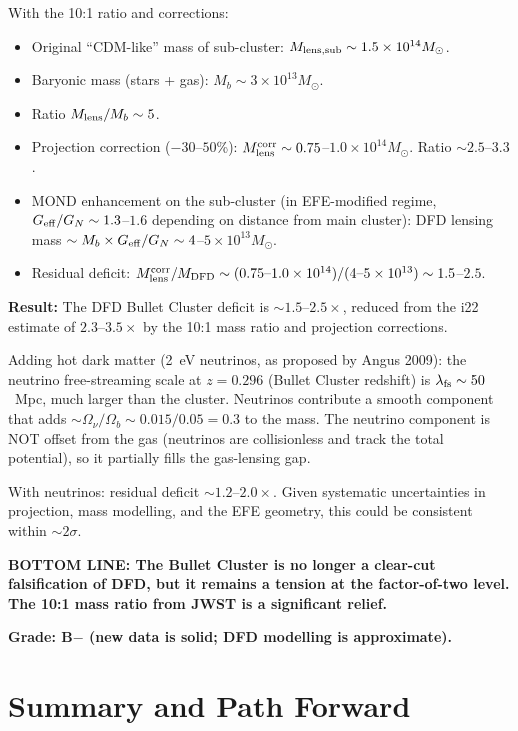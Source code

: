 \documentclass[11pt]{article}
\newcommand{\ee}[1]{\times 10^{#1}}
\newcommand{\Geff}{G_{\rm eff}}
\newcommand{\Ob}{\Omega_b}
\begin{document}
With the 10:1 ratio and corrections:
\begin{itemize}
\item Original ``CDM-like'' mass of sub-cluster: $M_{\rm lens,sub}
  \sim 1.5\ee{14} M_\odot$.
\item Baryonic mass (stars + gas): $M_b \sim 3\ee{13} M_\odot$.
\item Ratio $M_{\rm lens}/M_b \sim 5$.
\item Projection correction ($-30$--$50$\%): $M_{\rm lens}^{\rm corr}
  \sim 0.75$--$1.0\ee{14} M_\odot$.  Ratio $\sim 2.5$--$3.3$.
\item MOND enhancement on the sub-cluster (in EFE-modified regime,
  $\Geff/G_N \sim 1.3$--$1.6$ depending on distance from main cluster):
  DFD lensing mass $\sim M_b \times \Geff/G_N \sim 4$--$5\ee{13} M_\odot$.
\item Residual deficit: $M_{\rm lens}^{\rm corr}/M_{\rm DFD}
  \sim (0.75\text{--}1.0\ee{14})/(4\text{--}5\ee{13})
  \sim 1.5$--$2.5$.
\end{itemize}

\textbf{Result:}  The DFD Bullet Cluster deficit is $\sim 1.5$--$2.5
\times$, reduced from the i22 estimate of $2.3$--$3.5\times$ by the
10:1 mass ratio and projection corrections.

Adding hot dark matter (2~eV neutrinos, as proposed by Angus 2009):
the neutrino free-streaming scale at $z = 0.296$ (Bullet Cluster
redshift) is $\lambda_{\rm fs} \sim 50$~Mpc, much larger than the
cluster.  Neutrinos contribute a smooth component that adds $\sim
\Omega_\nu/\Ob \sim 0.015/0.05 = 0.3$ to the mass.  The neutrino
component is NOT offset from the gas (neutrinos are collisionless and
track the total potential), so it partially fills the gas-lensing gap.

With neutrinos: residual deficit $\sim 1.2$--$2.0\times$.  Given
systematic uncertainties in projection, mass modelling, and the EFE
geometry, this could be consistent within $\sim 2\sigma$.

\textbf{BOTTOM LINE:  The Bullet Cluster is no longer a clear-cut
falsification of DFD, but it remains a tension at the factor-of-two
level.  The 10:1 mass ratio from JWST is a significant relief.}

\textbf{Grade: B$-$ (new data is solid; DFD modelling is approximate).}

\section{Summary and Path Forward}
\label{sec:summary}
\end{document}
